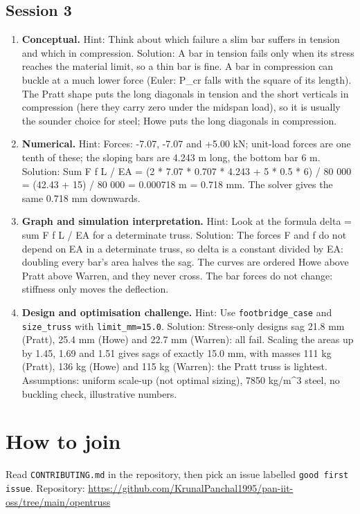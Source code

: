 \documentclass[11pt,a4paper]{article}
\begin{document}
\subsection*{Session 3}
\begin{enumerate}[nosep]
\item \textbf{Conceptual.} Hint: Think about which failure a slim bar suffers in tension and which in compression. Solution: A bar in tension fails only when its stress reaches the material limit, so a thin bar is fine. A bar in compression can buckle at a much lower force (Euler: P\_cr falls with the square of its length). The Pratt shape puts the long diagonals in tension and the short verticals in compression (here they carry zero under the midspan load), so it is usually the sounder choice for steel; Howe puts the long diagonals in compression.
\item \textbf{Numerical.} Hint: Forces: -7.07, -7.07 and +5.00 kN; unit-load forces are one tenth of these; the sloping bars are 4.243 m long, the bottom bar 6 m. Solution: Sum F f L / EA = (2 * 7.07 * 0.707 * 4.243 + 5 * 0.5 * 6) / 80 000 = (42.43 + 15) / 80 000 = 0.000718 m = 0.718 mm. The solver gives the same 0.718 mm downwards.
\item \textbf{Graph and simulation interpretation.} Hint: Look at the formula delta = sum F f L / EA for a determinate truss. Solution: The forces F and f do not depend on EA in a determinate truss, so delta is a constant divided by EA: doubling every bar's area halves the sag. The curves are ordered Howe above Pratt above Warren, and they never cross. The bar forces do not change: stiffness only moves the deflection.
\item \textbf{Design and optimisation challenge.} Hint: Use \texttt{footbridge\_case} and \texttt{size\_truss} with \texttt{limit\_mm=15.0}. Solution: Stress-only designs sag 21.8 mm (Pratt), 25.4 mm (Howe) and 22.7 mm (Warren): all fail. Scaling the areas up by 1.45, 1.69 and 1.51 gives sags of exactly 15.0 mm, with masses 111 kg (Pratt), 136 kg (Howe) and 115 kg (Warren): the Pratt truss is lightest. Assumptions: uniform scale-up (not optimal sizing), 7850 kg/m\textasciicircum{}3 steel, no buckling check, illustrative numbers.
\end{enumerate}

\section{How to join}
Read \texttt{CONTRIBUTING.md} in the repository, then pick an issue labelled \texttt{good first issue}. Repository: \url{https://github.com/KrunalPanchal1995/pan-iit-oss/tree/main/opentruss}
\end{document}
